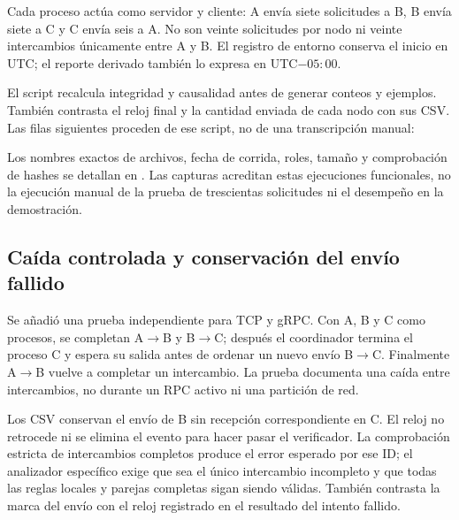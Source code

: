 Cada proceso actúa como servidor y cliente: A envía siete solicitudes a B,
B envía siete a C y C envía seis a A. No son veinte solicitudes por nodo ni
veinte intercambios únicamente entre A y B. El registro de entorno conserva el
inicio en UTC; el reporte derivado también lo expresa en UTC$-05{:}00$.

El script  recalcula integridad y
causalidad antes de generar conteos y ejemplos. También contrasta el reloj
final y la cantidad enviada de cada nodo con sus CSV. Las filas siguientes
proceden de ese script, no de una transcripción manual:

\begin{table}[htbp]
\centering
\small
{}
\caption{Verificación de las corridas funcionales de veinte intercambios.}
\label{tab:lamport20-verificacion}
\end{table}


Los nombres exactos de archivos, fecha de corrida, roles, tamaño y comprobación
de hashes se detallan en . Las capturas
acreditan estas ejecuciones funcionales, no la ejecución manual de la prueba
de trescientas solicitudes ni el desempeño en la demostración.

\subsection{Caída controlada y conservación del envío fallido}
Se añadió una prueba independiente para TCP y gRPC. Con A, B y C como procesos,
se completan A$\rightarrow$B y B$\rightarrow$C; después el coordinador termina
el proceso C y espera su salida antes de ordenar un nuevo envío B$\rightarrow$C.
Finalmente A$\rightarrow$B vuelve a completar un intercambio. La prueba documenta
una caída entre intercambios, no durante un RPC activo ni una partición de red.

Los CSV conservan el envío de B sin recepción correspondiente en C. El reloj no
retrocede ni se elimina el evento para hacer pasar el verificador. La comprobación
estricta de intercambios completos produce el error esperado por ese ID; el
analizador específico exige que sea el único intercambio incompleto y que todas
las reglas locales y parejas completas sigan siendo válidas. También contrasta
la marca del envío con el reloj registrado en el resultado del intento fallido.

